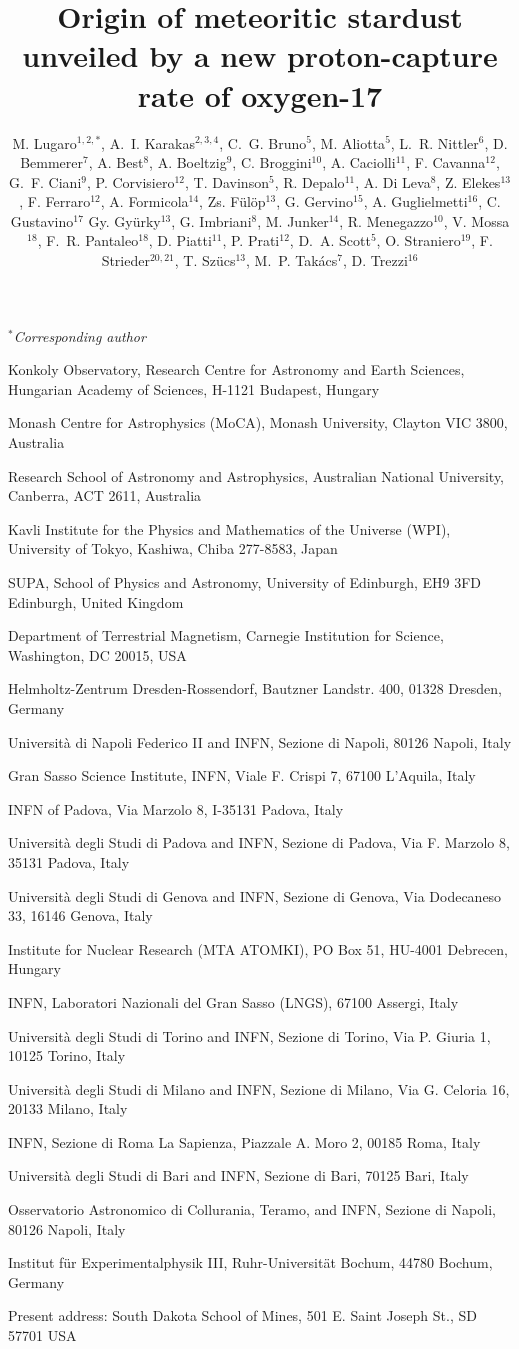 \documentclass{nature}
\title{Origin of meteoritic stardust unveiled by a new proton-capture 
rate of oxygen-17}
\author{M. Lugaro$^{1,2,*}$, A.~I. Karakas$^{2,3,4}$, C.~G. Bruno$^{5}$, M. 
Aliotta$^{5}$, L.~R. Nittler$^{6}$, D. Bemmerer$^{7}$,
A. Best$^{8}$, A. Boeltzig$^{9}$, C. Broggini$^{10}$, 
A. Caciolli$^{11}$, F. Cavanna$^{12}$, G.~F. Ciani$^{9}$,
P. Corvisiero$^{12}$, T. Davinson$^{5}$, R. Depalo$^{11}$, 
A. Di Leva$^{8}$, Z. Elekes$^{13}$, F. Ferraro$^{12}$, 
A. Formicola$^{14}$,
Zs. F\"ul\"op$^{13}$, 
G. Gervino$^{15}$, A. Guglielmetti$^{16}$, C. Gustavino$^{17}$
Gy. Gy\"urky$^{13}$, G. Imbriani$^{8}$, M. Junker$^{14}$,
R. Menegazzo$^{10}$, V. Mossa$^{18}$, F.~R. Pantaleo$^{18}$, D. Piatti$^{11}$,
P. Prati$^{12}$,
D.~A. Scott$^{5}$,
O. Straniero$^{19}$, F. Strieder$^{20,21}$, T. Sz\"ucs$^{13}$, M.~P. Tak\'acs$^{7}$,
D. Trezzi$^{16}$}
\begin{document}
\maketitle

\noindent $^*${\it Corresponding author}
\begin{affiliations}
 \item Konkoly Observatory, Research Centre for Astronomy and Earth Sciences, 
Hungarian Academy of Sciences, H-1121 Budapest, Hungary
 \item Monash Centre for Astrophysics (MoCA), Monash University, Clayton VIC
3800, Australia
 \item Research School of Astronomy and Astrophysics, Australian National
University, Canberra, ACT 2611, Australia
 \item
Kavli Institute for the Physics and Mathematics of the Universe (WPI), University of Tokyo, 
Kashiwa, Chiba 277-8583, Japan
 \item SUPA, School of Physics and Astronomy, University of Edinburgh, EH9 3FD 
Edinburgh, United Kingdom
 \item Department of Terrestrial Magnetism, Carnegie Institution for Science, 
Washington, DC 20015, USA
 \item Helmholtz-Zentrum Dresden-Rossendorf, Bautzner Landstr. 400, 01328 
Dresden, Germany
\item Universit\`a di Napoli Federico II and INFN, Sezione di Napoli, 80126 Napoli, Italy
\item Gran Sasso Science Institute, INFN, Viale F. Crispi 7, 67100 L'Aquila, Italy
\item INFN of Padova, Via Marzolo 8, I-35131 Padova, Italy
\item Universit\`a degli Studi di Padova and INFN, Sezione di Padova, Via F. Marzolo 8, 35131 Padova, Italy
\item Universit\`a degli Studi di Genova and INFN, Sezione di Genova, Via Dodecaneso 33, 16146 Genova, Italy
\item Institute for Nuclear Research (MTA ATOMKI), PO Box 51, HU-4001 Debrecen, Hungary
\item INFN, Laboratori Nazionali del Gran Sasso (LNGS), 67100 Assergi, Italy
\item Universit\`a degli Studi di Torino and INFN, Sezione di Torino, Via P. Giuria 1, 10125 Torino, Italy
\item Universit\`a degli Studi di Milano and INFN, Sezione di Milano, Via G. Celoria 16, 20133 Milano, Italy 
\item INFN, Sezione di Roma La Sapienza, Piazzale A. Moro 2, 00185 Roma, Italy
\item Universit\`a degli Studi di Bari and INFN, Sezione di Bari, 70125 Bari, Italy
\item Osservatorio Astronomico di Collurania, Teramo, and INFN, Sezione di Napoli, 80126 Napoli, Italy
\item Institut f\"ur Experimentalphysik III, Ruhr-Universit\"at Bochum, 44780 Bochum, Germany
\item Present address: South Dakota School of Mines, 501 E. Saint Joseph St., SD 57701 USA


\end{affiliations}
\end{document}
